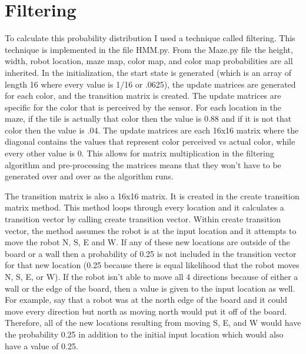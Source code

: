 \documentclass{article}
\begin{document}
\section{Filtering}
To calculate this probability distribution I used a technique called filtering. This technique is implemented in the file HMM.py. From the Maze.py file the height, width, robot location, maze map, color map, and color map probabilities are all inherited. In the initialization, the start state is generated (which is an array of length 16 where every value is 1/16 or .0625), the update matrices are generated for each color, and the transition matrix is created. The update matrices are specific for the color that is perceived by the sensor. For each location in the maze, if the tile is actually that color then the value is 0.88 and if it is not that color then the value is .04. The update matrices are each 16x16 matrix where the diagonal contains the values that represent color perceived vs actual color, while every other value is 0. This allows for matrix multiplication in the filtering algorithm and pre-processing the matrices means that they won't have to be generated over and over as the algorithm runs.

The transition matrix is also a 16x16 matrix. It is created in the create transition matrix method. This method loops through every location and it calculates a transition vector by calling create transition vector. Within create transition vector, the method assumes the robot is at the input location and it attempts to move the robot N, S, E and W. If any of these new locations are outside of the board or a wall then a probability of 0.25 is not included in the transition vector for that new location (0.25 because there is equal likelihood that the robot moves N, S, E, or W). If the robot isn't able to move all 4 directions because of either a wall or the edge of the board, then a value is given to the input location as well. For example, say that a robot was at the north edge of the board and it could move every direction but north as moving north would put it off of the board. Therefore, all of the new locations resulting from moving S, E, and W would have the probability 0.25 in addition to the initial input location which would also have a value of 0.25.
\end{document}
